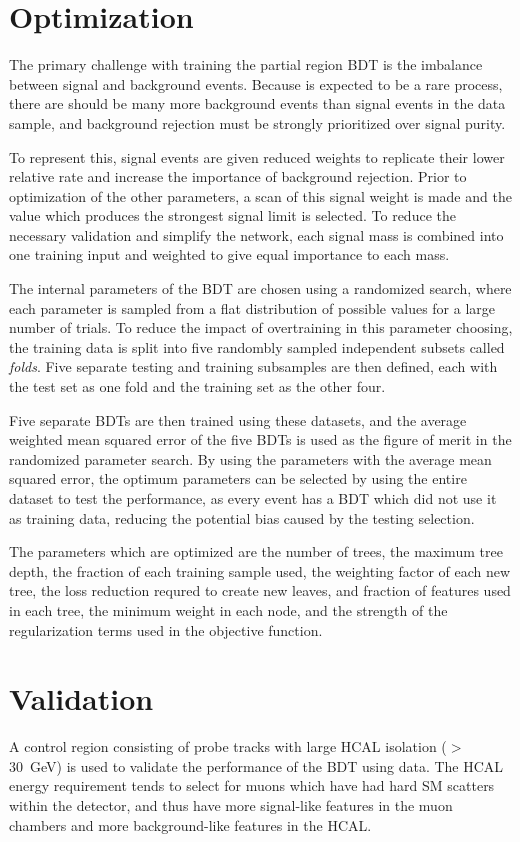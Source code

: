 \section{Optimization}
The primary challenge with training the partial region BDT is the imbalance between signal and background events. 
Because \dbrem is expected to be a rare process, there are should be many more background events than signal events in the data sample, and background rejection must be strongly prioritized over signal purity.

To represent this, signal events are given reduced weights to replicate their lower relative rate and increase the importance of background rejection.
Prior to optimization of the other parameters, a scan of this signal weight is made and the value which produces the strongest signal limit is selected.
To reduce the necessary validation and simplify the network, each signal mass is combined into one training input and weighted to give equal importance to each mass.

The internal parameters of the BDT are chosen using a randomized search, where each parameter is sampled from a flat distribution of possible values for a large number of trials.
To reduce the impact of overtraining in this parameter choosing, the training data is split into five randombly sampled independent subsets called \emph{folds}.
Five separate testing and training subsamples are then defined, each with the test set as one fold and the training set as the other four.

Five separate BDTs are then trained using these datasets, and the average weighted mean squared error of the five BDTs is used as the figure of merit in the randomized parameter search.
By using the parameters with the average mean squared error, the optimum parameters can be selected by using the entire dataset to test the performance, as every event has a BDT which did not use it as training data, reducing the potential bias caused by the testing selection.

The parameters which are optimized are the number of trees, the maximum tree depth, the fraction of each training sample used, the weighting factor of each new tree, the loss reduction requred to create new leaves, and fraction of features used in each tree, the minimum weight in each node, and the strength of the regularization terms used in the objective function.

\section{Validation}
\label{sec:BDTvalid}
A control region consisting of probe tracks with large HCAL isolation ($>$\SI{30}{\giga\eV}) is used to validate the performance of the BDT using data.
The HCAL energy requirement tends to select for muons which have had hard SM scatters within the detector, and thus have more signal-like features in the muon chambers and more background-like features in the HCAL.

